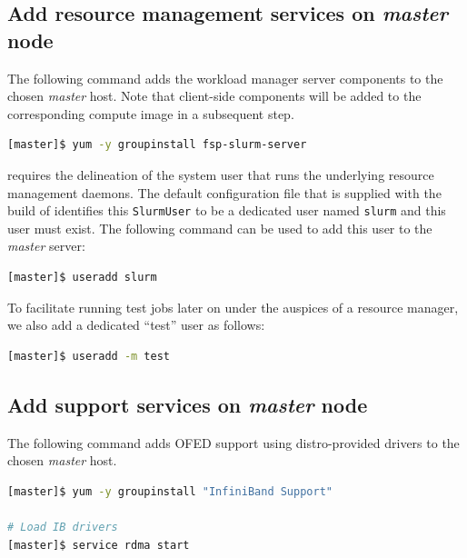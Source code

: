 \documentclass[letterpaper]{article}
\begin{document}
\subsection{Add resource management services on {\em master} node} \label{sec:add_rm}

The following command adds the \SLURM{} workload manager server components to the
chosen {\em master} host. Note that client-side components will be added to
the corresponding compute image in a subsequent step.

\begin{lstlisting}[language=bash,keywords={}]
[master]$ yum -y groupinstall fsp-slurm-server
\end{lstlisting}

\SLURM{} requires the delineation of the system user that runs the underlying
resource management daemons. The default configuration file that is supplied
with the \FSP{} build of \SLURM{} identifies this \texttt{SlurmUser} to be a
dedicated user named \texttt{slurm} and this user must exist. 
The following command can be used to add this user to the {\em
  master} server:

\begin{lstlisting}[language=bash,keywords={}]
[master]$ useradd slurm
\end{lstlisting}

To facilitate running test jobs later on under the auspices of a resource
manager, we also add a dedicated ``test'' user as follows:

\begin{lstlisting}[language=bash,keywords={}]
[master]$ useradd -m test
\end{lstlisting}

\newpage
\subsection{Add \InfiniBand{} support services on {\em master} node} \label{sec:add_ofed}

The following command adds OFED support using distro-provided drivers to the
chosen {\em master} host. 

\begin{lstlisting}[language=bash,keywords={}]
[master]$ yum -y groupinstall "InfiniBand Support"

# Load IB drivers
[master]$ service rdma start
\end{lstlisting}
\end{document}
